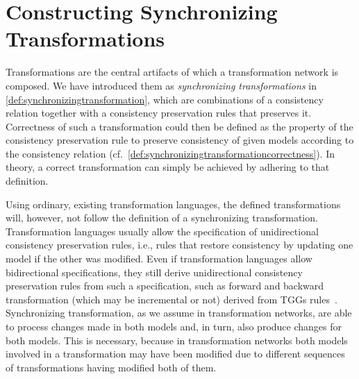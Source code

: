\chapter{Constructing Synchronizing Transformations
}
\label{chap:synchronization}



Transformations are the central artifacts of which a transformation network is composed.
We have introduced them as \emph{synchronizing transformations} in \autoref{def:synchronizingtransformation}, which are combinations of a consistency relation together with a consistency preservation rules that preserves it.
Correctness of such a transformation could then be defined as the property of the consistency preservation rule to preserve consistency of given models according to the consistency relation (cf.\ \autoref{def:synchronizingtransformationcorrectness}).
In theory, a correct transformation can simply be achieved by adhering to that definition.

Using ordinary, existing transformation languages, the defined transformations will, however, not follow the definition of a synchronizing transformation.
Transformation languages usually allow the specification of unidirectional consistency preservation rules, i.e., rules that restore consistency by updating one model if the other was modified.
Even if transformation languages allow bidirectional specifications, they still derive unidirectional consistency preservation rules from such a specification, such as forward and backward transformation (which may be incremental or not) derived from \glspl{TGG} rules~\cite{leblebici2014IncrementalTGGSurvey}.
Synchronizing transformation, as we assume in transformation networks, are able to process changes made in both models and, in turn, also produce changes for both models.
This is necessary, because in transformation networks both models involved in a transformation may have been modified due to different sequences of transformations having modified both of them.

